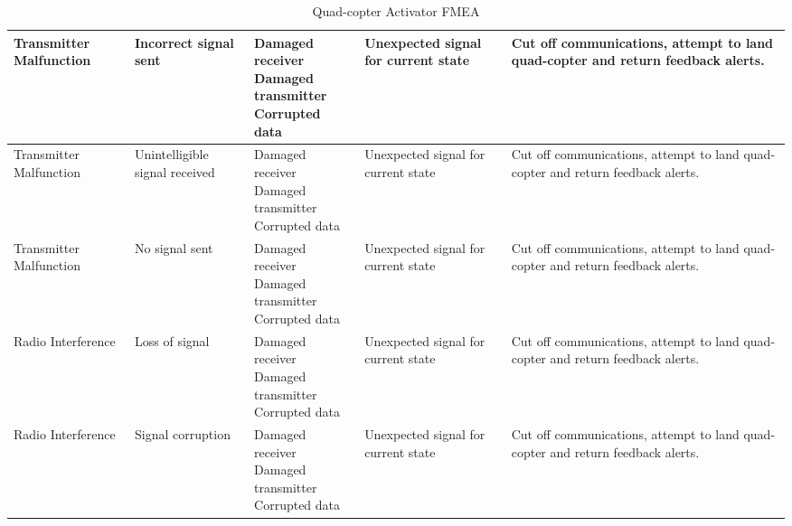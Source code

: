 \documentclass[10pt,letterpaper]{article}
\begin{document}
\begin{table}[H]
\begin{adjustwidth}{-1.8in}{-1.8in}
\begin{center}
\begin{tabular}{|p{3cm}p{3cm}p{3cm}p{3cm}p{3cm}|}
              Transmitter Malfunction & 
              Incorrect signal sent & 
              \parbox[t]{3cm}{Damaged receiver \\ Damaged transmitter \\ Corrupted data} &  
              Unexpected signal for current state & 
              Cut off communications, attempt to land quad-copter and return feedback alerts. \\ \hline  
              
              Transmitter Malfunction & 
              Unintelligible signal received & 
              \parbox[t]{3cm}{Damaged receiver \\ Damaged transmitter \\ Corrupted data} &  
              Unexpected signal for current state & 
              Cut off communications, attempt to land quad-copter and return feedback alerts. \\ \hline  
              
              Transmitter Malfunction & 
              No signal sent & 
              \parbox[t]{3cm}{Damaged receiver \\ Damaged transmitter \\ Corrupted data} &  
              Unexpected signal for current state & 
              Cut off communications, attempt to land quad-copter and return feedback alerts. \\ \hline  
              
              Radio Interference & 
              Loss of signal & 
              \parbox[t]{3cm}{Damaged receiver \\ Damaged transmitter \\ Corrupted data} &  
              Unexpected signal for current state & 
              Cut off communications, attempt to land quad-copter and return feedback alerts. \\ \hline  
              
              Radio Interference & 
              Signal corruption & 
              \parbox[t]{3cm}{Damaged receiver \\ Damaged transmitter \\ Corrupted data} &  
              Unexpected signal for current state & 
              Cut off communications, attempt to land quad-copter and return feedback alerts. \\ \hline  
              
          \end{tabular}
      \end{center}
      \caption[Quad-copter Activator FMEA]{Quad-copter Activator FMEA}
    \end{adjustwidth}
\end{table}
\end{document}
